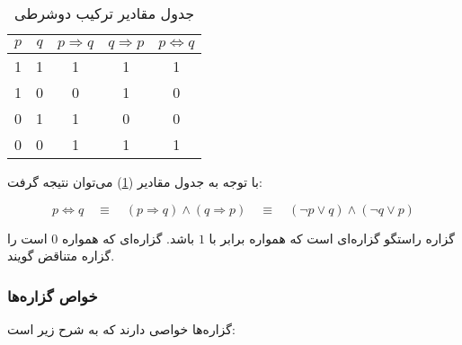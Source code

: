 \documentclass[a4paper]{article}
\begin{document}
\begin{table}[htbp]
\caption{\label{tb:imi}جدول مقادیر ترکیب دوشرطی}
\centering
\begin{tabular}{cc|cc|c}
\(p\) & \(q\) & \(p \Rightarrow q\) & \(q \Rightarrow p\) & \(p \Leftrightarrow q\)\\
\hline
1 & 1 & 1 & 1 & 1\\
1 & 0 & 0 & 1 & 0\\
0 & 1 & 1 & 0 & 0\\
0 & 0 & 1 & 1 & 1\\
\end{tabular}
\end{table}

با توجه به جدول مقادیر (\ref{tb:imi}) می‌توان نتیجه گرفت:

\begin{equation}
p \Leftrightarrow q \quad \equiv \quad (p \Rightarrow q) \land (q \Rightarrow p) \quad \equiv \quad (\lnot p \lor q) \land (\lnot q \lor p)
\end{equation}

گزاره راستگو گزاره‌ای است که همواره برابر با \(1\) باشد.
گزاره‌ای که همواره \(0\) است را گزاره متناقض گویند.

\subsubsection{خواص گزاره‌ها}
\label{sec:org4280232}
گزاره‌ها خواصی دارند که به شرح زیر است:
\end{document}
